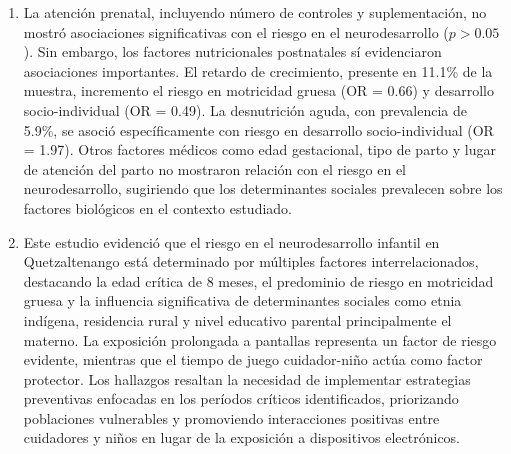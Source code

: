 \begin{enumerate}
\item La atención prenatal, incluyendo número de controles y suplementación,
no mostró asociaciones significativas con el riesgo en el neurodesarrollo
($p > 0.05$). Sin embargo, los factores nutricionales postnatales sí
evidenciaron asociaciones importantes. El retardo de crecimiento, presente en
11.1\% de la muestra, incremento el riesgo en motricidad gruesa (OR = 0.66)
y desarrollo socio-individual (OR = 0.49). La desnutrición aguda, con
prevalencia de 5.9\%, se asoció específicamente con riesgo en desarrollo
socio-individual (OR = 1.97). Otros factores médicos como edad gestacional,
tipo de parto y lugar de atención del parto no mostraron relación con el
riesgo en el neurodesarrollo, sugiriendo que los determinantes sociales
prevalecen sobre los factores biológicos en el contexto estudiado.

\item Este estudio evidenció que el riesgo en el neurodesarrollo infantil en
Quetzaltenango está determinado por múltiples factores interrelacionados,
destacando la edad crítica de 8 meses, el predominio de riesgo en motricidad
gruesa y la influencia significativa de determinantes sociales como etnia
indígena, residencia rural y nivel educativo parental principalmente el materno.
La exposición prolongada a pantallas representa un factor de riesgo evidente,
mientras que el tiempo de juego cuidador-niño actúa como factor protector.
Los hallazgos resaltan la necesidad de implementar estrategias preventivas
enfocadas en los períodos críticos identificados, priorizando poblaciones
vulnerables y promoviendo interacciones positivas entre cuidadores y niños
en lugar de la exposición a dispositivos electrónicos.
\end{enumerate}
